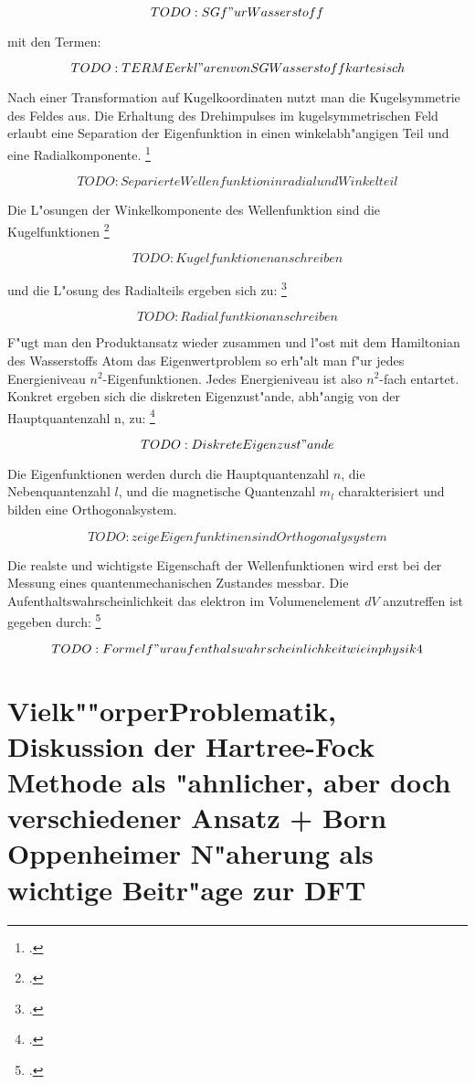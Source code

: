 $$TODO: SG f"ur Wasserstoff$$

mit den Termen: 

$$TODO: TERME erkl"aren von SG Wasserstoff kartesisch$$

Nach einer Transformation auf Kugelkoordinaten nutzt man die Kugelsymmetrie des Feldes aus. Die Erhaltung des Drehimpulses im kugelsymmetrischen Feld erlaubt  eine Separation der Eigenfunktion in einen winkelabh"angigen Teil und eine Radialkomponente. \footcite[vgl.][218]{physik4}

$$TODO: Separierte Wellenfunktion in radial und Winkelteil$$

Die L"osungen der Winkelkomponente des Wellenfunktion sind die Kugelfunktionen \footcite[vgl.][222]{physik4}

$$TODO: Kugelfunktionen anschreiben$$

und die L"osung des Radialteils ergeben sich zu: \footcite[vgl.][230]{physik4}

$$TODO: Radialfuntkion anschreiben$$

F"ugt man den Produktansatz wieder zusammen und l"ost mit dem Hamiltonian des Wasserstoffs Atom das Eigenwertproblem  so erh"alt man f"ur jedes Energieniveau $n^2$-Eigenfunktionen. Jedes Energieniveau ist also $n^2$-fach entartet. Konkret ergeben sich die diskreten Eigenzust"ande, abh"angig von der Hauptquantenzahl n, zu: \footcite[vgl.][234]{physik4}


$$TODO: Diskrete Eigenzust"ande$$

Die Eigenfunktionen werden durch die Hauptquantenzahl $n$, die Nebenquantenzahl $l$, und die magnetische Quantenzahl $m_l$ charakterisiert und bilden eine Orthogonalsystem. 

$$TODO: zeige Eigenfunktinen sind Orthogonalysystem$$

Die realste und wichtigste Eigenschaft der Wellenfunktionen wird erst bei der Messung eines quantenmechanischen Zustandes messbar. Die Aufenthaltswahrscheinlichkeit das elektron im Volumenelement $dV$ anzutreffen ist gegeben durch: \footcite[vgl.][234]{physik4}

$$TODO: Formel f"ur aufenthalswahrscheinlichkeit wie in physik 4$$






\section{Vielk""orperProblematik, Diskussion der Hartree-Fock Methode als "ahnlicher, aber doch verschiedener Ansatz + Born Oppenheimer N"aherung als wichtige Beitr"age zur DFT}

